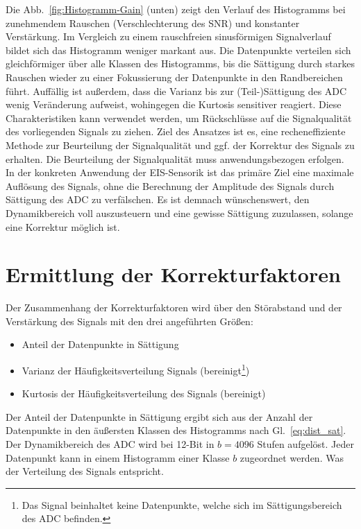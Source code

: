 Die Abb.~\ref{fig:Histogramm-Gain} (unten) zeigt den Verlauf des Histogramms bei zunehmendem Rauschen (Verschlechterung des SNR) und konstanter Verstärkung. Im Vergleich zu einem rauschfreien sinusförmigen Signalverlauf bildet sich das Histogramm weniger markant aus. Die Datenpunkte verteilen sich gleichförmiger über alle Klassen des Histogramms, bis die Sättigung durch starkes Rauschen wieder zu einer Fokussierung der Datenpunkte in den Randbereichen führt. Auffällig ist außerdem, dass die Varianz bis zur (Teil-)Sättigung des ADC wenig Veränderung aufweist, wohingegen die Kurtosis sensitiver reagiert. Diese Charakteristiken kann verwendet werden, um Rückschlüsse auf die Signalqualität des vorliegenden Signals zu ziehen. Ziel des Ansatzes ist es, eine recheneffiziente Methode zur Beurteilung der Signalqualität und ggf. der Korrektur des Signals zu erhalten. Die Beurteilung der Signalqualität muss anwendungsbezogen erfolgen. In der konkreten Anwendung der EIS-Sensorik ist das primäre Ziel eine maximale Auflösung des Signals, ohne die Berechnung der Amplitude des Signals durch Sättigung des ADC zu verfälschen. Es ist demnach wünschenswert, den Dynamikbereich voll auszusteuern und eine gewisse Sättigung zuzulassen, solange eine Korrektur möglich ist.

\section{Ermittlung der Korrekturfaktoren}
Der Zusammenhang der Korrekturfaktoren wird über den Störabstand und der Verstärkung des Signals mit den drei angeführten Größen: 
\begin{itemize}
	\item Anteil der Datenpunkte in Sättigung %
	\item Varianz der Häufigkeitsverteilung Signals (bereinigt\footnote[1]{Das Signal beinhaltet keine Datenpunkte, welche sich im Sättigungsbereich des ADC befinden.\label{foot:bereinigt}})
	\item Kurtosis der Häufigkeitsverteilung des Signals (bereinigt)
\end{itemize}


Der Anteil der Datenpunkte in Sättigung ergibt sich aus der Anzahl der Datenpunkte in den äußersten Klassen des Histogramms nach Gl.~\eqref{eq:dist_sat}. Der Dynamikbereich des ADC wird bei 12-Bit in $b=4096$ Stufen aufgelöst. Jeder Datenpunkt kann in einem Histogramm einer Klasse $b$ zugeordnet werden. Was der Verteilung des Signals entspricht. 

